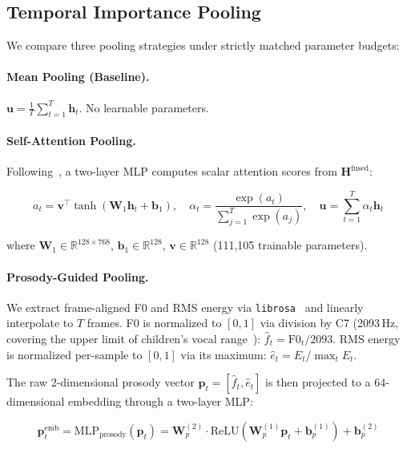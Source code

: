 \subsection{Temporal Importance Pooling}
\label{ssec:pooling}

We compare three pooling strategies under strictly matched parameter budgets:

\paragraph{Mean Pooling (Baseline).}
$\mathbf{u} = \frac{1}{T}\sum_{t=1}^{T} \mathbf{h}_t$. No learnable parameters.

\paragraph{Self-Attention Pooling.}
Following~\cite{lin2017structured}, a two-layer MLP computes scalar attention
scores from $\mathbf{H}^{\text{fused}}$:

\begin{equation}
a_t = \mathbf{v}^\top \tanh(\mathbf{W}_1 \mathbf{h}_t + \mathbf{b}_1), \quad
\alpha_t = \frac{\exp(a_t)}{\sum_{j=1}^{T} \exp(a_j)}, \quad
\mathbf{u} = \sum_{t=1}^{T} \alpha_t \mathbf{h}_t
\end{equation}

where $\mathbf{W}_1 \in \mathbb{R}^{128 \times 768}$, $\mathbf{b}_1 \in \mathbb{R}^{128}$,
$\mathbf{v} \in \mathbb{R}^{128}$ (111,105 trainable parameters).

\paragraph{Prosody-Guided Pooling.}
We extract frame-aligned F0 and RMS energy via
\texttt{librosa}~\cite{mcfee2015librosa} and linearly interpolate to $T$ frames.
F0 is normalized to $[0,1]$ via division by C7 (2093\,Hz, covering the upper
limit of children's vocal range~\cite{tavares2010normative}):
$\hat{f}_t = \text{F0}_t / 2093$. RMS energy is normalized per-sample to $[0,1]$
via its maximum: $\hat{e}_t = E_t / \max_{t} E_t$.

The raw 2-dimensional prosody vector $\mathbf{p}_t = [\hat{f}_t, \hat{e}_t]$ is
then projected to a 64-dimensional embedding through a two-layer MLP:

\begin{equation}
\mathbf{p}_t^{\text{emb}} = \text{MLP}_{\text{prosody}}(\mathbf{p}_t)
= \mathbf{W}_p^{(2)} \cdot \text{ReLU}(\mathbf{W}_p^{(1)} \mathbf{p}_t + \mathbf{b}_p^{(1)}) + \mathbf{b}_p^{(2)}
\end{equation}

